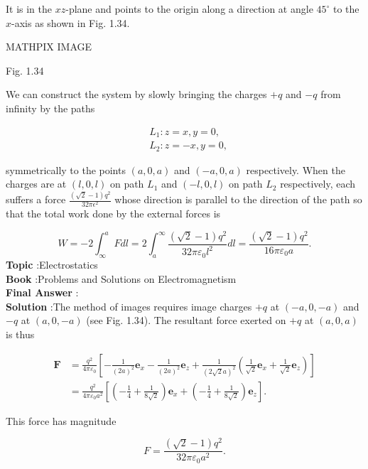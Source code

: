 \documentclass[10pt]{article}
\begin{document}
It is in the $x z$-plane and points to the origin along a direction at angle $45^{\circ}$ to the $x$-axis as shown in Fig. 1.34.

MATHPIX IMAGE

Fig. 1.34

 We can construct the system by slowly bringing the charges $+q$ and $-q$ from infinity by the paths

$$
\begin{aligned}
&L_{1}: z=x, y=0, \\
&L_{2}: z=-x, y=0,
\end{aligned}
$$

symmetrically to the points $(a, 0, a)$ and $(-a, 0, a)$ respectively. When the charges are at $(l, 0, l)$ on path $L_{1}$ and $(-l, 0, l)$ on path $L_{2}$ respectively, each suffers a force $\frac{(\sqrt{2}-1) q^{2}}{32 \pi \epsilon^{2}}$ whose direction is parallel to the direction of the path so that the total work done by the external forces is

$$
W=-2 \int_{\infty}^{a} F d l=2 \int_{a}^{\infty} \frac{(\sqrt{2}-1) q^{2}}{32 \pi \varepsilon_{0} l^{2}} d l=\frac{(\sqrt{2}-1) q^{2}}{16 \pi \varepsilon_{0} a} .
$$
\textbf{Topic} :Electrostatics\\
\textbf{Book} :Problems and Solutions on Electromagnetism\\
\textbf{Final Answer} :\\


\textbf{Solution} :The method of images requires image charges $+q$ at $(-a, 0,-a)$ and $-q$ at $(a, 0,-a)$ (see Fig. 1.34). The resultant force exerted on $+q$ at $(a, 0, a)$ is thus

$$
\begin{aligned}
\mathbf{F} &=\frac{q^{2}}{4 \pi \varepsilon_{0}}\left[-\frac{1}{(2 a)^{2}} \mathbf{e}_{x}-\frac{1}{(2 a)^{2}} \mathbf{e}_{z}+\frac{1}{(2 \sqrt{2} a)^{2}}\left(\frac{1}{\sqrt{2}} \mathbf{e}_{x}+\frac{1}{\sqrt{2}} \mathbf{e}_{z}\right)\right] \\
&=\frac{q^{2}}{4 \pi \varepsilon_{0} a^{2}}\left[\left(-\frac{1}{4}+\frac{1}{8 \sqrt{2}}\right) \mathbf{e}_{x}+\left(-\frac{1}{4}+\frac{1}{8 \sqrt{2}}\right) \mathbf{e}_{z}\right] .
\end{aligned}
$$

This force has magnitude

$$
F=\frac{(\sqrt{2}-1) q^{2}}{32 \pi \varepsilon_{0} a^{2}} .
$$
\end{document}
